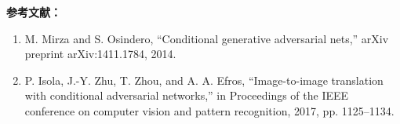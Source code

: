 \textbf{参考文献：}
\begin{enumerate}
\item M. Mirza and S. Osindero, “Conditional generative adversarial nets,” arXiv preprint arXiv:1411.1784, 2014.
\item P. Isola, J.-Y. Zhu, T. Zhou, and A. A. Efros, “Image-to-image translation with conditional adversarial networks,” in Proceedings of the IEEE conference on computer vision and pattern recognition, 2017, pp. 1125–1134.
\end{enumerate}
